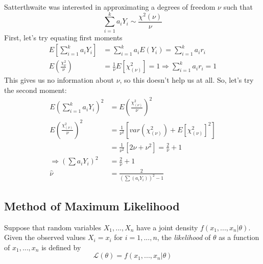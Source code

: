 \documentclass{article}
\begin{document}
\begin{enumerate}
    Satterthwaite was interested in approximating a degrees of freedom $\nu$ such that
    \begin{equation*}
        \sum_{i=1}^k a_i Y_i \sim \frac{\chi^2{(\nu)}}{\nu}
    \end{equation*}
    First, let's try equating first moments
    \begin{equation*}
        \begin{split}
            E\left[\sum_{i=1}^k a_i Y_i \right] &= \sum_{i=1}^k a_i E(Y_i) = \sum_{i=1}^k a_i r_i\\
            E\left(\frac{\chi^2_{\nu}}{\nu} \right) &= \frac{1}{\nu}E[\chi^2_{(\nu)}] = 1 \Rightarrow \sum_{i=1}^k a_i r_i = 1
        \end{split}
    \end{equation*}
    This gives us no information about $\nu$, so this doesn't help us at all. So, let's try the second moment:
    \begin{equation*}
    \begin{split}
        E\left(\sum_{i=1}^k a_i Y_i \right)^2 &= E\left( \frac{\chi^2_{(\nu)}}{\nu} \right)^2\\
        E\left(\frac{\chi^2_{(\nu)}}{\nu} \right)^2 &= \frac{1}{\nu^2} \left[var\left(\chi^2_{(\nu)} \right) + E\left[\chi^2_{(\nu)} \right]^2\right]\\
        &= \frac{1}{\nu^2} \left[2 \nu + \nu^2 \right] = \frac{2}{\nu} + 1\\
        \Rightarrow \left(\sum a_i Y_i \right)^2 &= \frac{2}{\nu} + 1\\
        \hat{\nu} &= \frac{2}{\left(\sum(a_i Y_i) \right)^2-1}
    \end{split}
    \end{equation*}
\end{enumerate}

\subsection{Method of Maximum Likelihood}
Suppose that random variables $X_1,...,X_n$ have a joint density $f(x_1,...,x_n|\theta)$. Given the observed values $X_i = x_i$ for $i = 1,...,n$, the \textit{likelihood} of $\theta$ as a function of $x_1,...,x_n$ is defined by
\begin{equation*}
    \mathcal{L}(\theta) = f(x_1,...,x_n|\theta)
\end{equation*}
\end{document}
